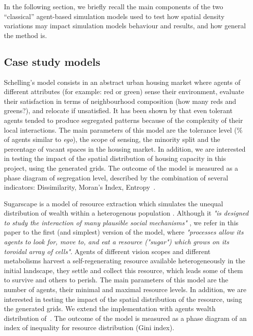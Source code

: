 \documentclass[3p,times,procedia]{elsarticle}
\begin{document}
In the following section, we briefly recall the main components of the two ``classical'' agent-based simulation models used to test how spatial density variations may impact simulation models behaviour and results, and how general the method is.

\subsection{Case study models}


Schelling's model consists in an abstract urban housing market where agents of different attributes (for example: red or green) sense their environment, evaluate their satisfaction in terms of neighbourhood composition (how many reds and greens?), and relocate if unsatisfied. It has been shown by \cite{Schelling1969} that even tolerant agents tended to produce segregated patterns because of the complexity of their local interactions. The main parameters of this model are the tolerance level (\% of agents similar to {\it ego}), the scope of sensing, the minority split and the percentage of vacant spaces in the housing market. In addition, we are interested in testing the impact of the spatial distribution of housing capacity in this project, using the generated grids. The outcome of the model is measured as a phase diagram of segregation level, described by the combination of several indicators: Dissimilarity, Moran's Index, Entropy~\citep{brown2006spatial}.

Sugarscape is a model of resource extraction which simulates the unequal distribution of wealth within a heterogenous population \citep{EpsteinAxtell1996}. Although it {\it "is designed to study the interaction of many plausible social mechanisms"} \citep[p.125]{Axtelletal1996}, we refer in this paper to the first (and simplest) version of the model, where {\it "processes allow its agents to look for, move to, and eat a resource ("sugar") which grows on its toroidal array of cells"}. Agents of different vision scopes and different metabolisms harvest a self-regenerating resource available heterogeneously in the initial landscape, they settle and collect this resource, which leads some of them to survive and others to perish. The main parameters of this model are the number of agents, their minimal and maximal resource levels. In addition, we are interested in testing the impact of the spatial distribution of the resource, using the generated grids. We extend the implementation with agents wealth distribution of~\citet{li2009netlogo}. The outcome of the model is measured as a phase diagram of an index of inequality for resource distribution (Gini index). 
\end{document}

